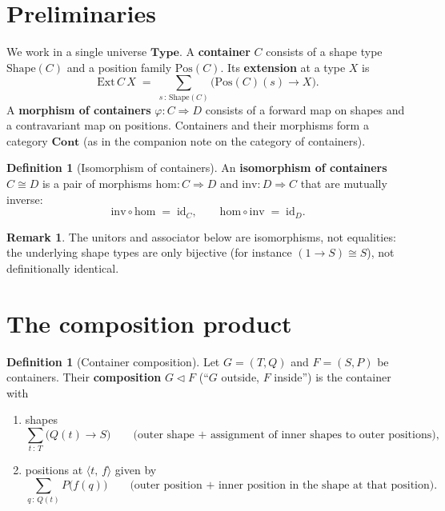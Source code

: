 \documentclass[11pt,a4paper]{article}
\theoremstyle{plain}
\theoremstyle{definition}
\newtheorem{definition}[theorem]{Definition}
\newtheorem{remark}[theorem]{Remark}
\newcommand{\Ext}{\mathrm{Ext}}
\newcommand{\Shape}{\mathrm{Shape}}
\newcommand{\Pos}{\mathrm{Pos}}
\newcommand{\Type}{\mathbf{Type}}
\newcommand{\id}{\mathrm{id}}
\newcommand{\Cont}{\mathbf{Cont}}
\newcommand{\compop}{\mathbin{\triangleleft}}
\begin{document}
\section{Preliminaries}

We work in a single universe $\Type$. A \textbf{container} $C$ consists of a
shape type $\Shape(C)$ and a position family $\Pos(C)$. Its \textbf{extension}
at a type $X$ is
\[
  \Ext\,C\,X \;=\; \sum_{s\,:\,\Shape(C)}\bigl(\Pos(C)(s)\to X\bigr).
\]
A \textbf{morphism of containers} $\varphi:C\Rightarrow D$ consists of a
forward map on shapes and a contravariant map on positions. Containers and
their morphisms form a category $\Cont$ (as in the companion note on the
category of containers).

\begin{definition}[Isomorphism of containers]\label{def:iso}
An \textbf{isomorphism of containers} $C\cong D$ is a pair of morphisms
$\mathrm{hom}:C\Rightarrow D$ and $\mathrm{inv}:D\Rightarrow C$ that are
mutually inverse:
\begin{equation}
  \mathrm{inv}\circ\mathrm{hom} \;=\; \id_C,
  \qquad
  \mathrm{hom}\circ\mathrm{inv} \;=\; \id_D.
\end{equation}
\end{definition}

\begin{remark}
The unitors and associator below are isomorphisms, not equalities: the
underlying shape types are only bijective (for instance
$(1\to S)\cong S$), not definitionally identical.
\end{remark}

\section{The composition product}

\begin{definition}[Container composition]\label{def:comp}
Let $G=(T,Q)$ and $F=(S,P)$ be containers. Their \textbf{composition}
$G\compop F$ (``$G$ outside, $F$ inside'') is the container with
\begin{enumerate}
  \item shapes
        \[
          \sum_{t\,:\,T}\bigl(Q(t)\to S\bigr)
          \qquad
          \text{(outer shape + assignment of inner shapes to outer positions),}
        \]
  \item positions at $\langle t,\,f\rangle$ given by
        \[
          \sum_{q\,:\,Q(t)} P\bigl(f(q)\bigr)
          \qquad
          \text{(outer position + inner position in the shape at that position).}
        \]
\end{enumerate}
\end{definition}
\end{document}
